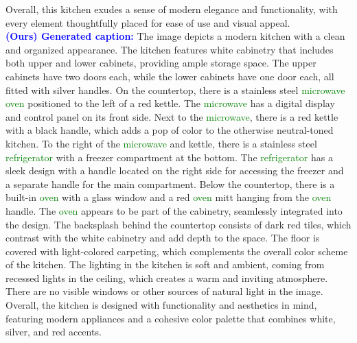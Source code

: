 \begin{tcolorbox}[colback=blue!5!white, colframe=blue!50!black, width=\textwidth, sharp corners, boxrule=0.5mm]
{            Overall, this kitchen exudes a sense of modern elegance and functionality, with every element thoughtfully placed for ease of use and visual appeal.
            \\
            \textcolor{blue}{\textbf{\algname (Ours) Generated caption:}} The image depicts a modern kitchen with a clean and organized appearance. The kitchen features white cabinetry that includes both upper and lower cabinets, providing ample storage space. The upper cabinets have two doors each, while the lower cabinets have one door each, all fitted with silver handles.
            On the countertop, there is a stainless steel \textcolor{green}{microwave} \textcolor{green}{oven} positioned to the left of a red kettle. The \textcolor{green}{microwave} has a digital display and control panel on its front side. Next to the \textcolor{green}{microwave}, there is a red kettle with a black handle, which adds a pop of color to the otherwise neutral-toned kitchen.
            To the right of the \textcolor{green}{microwave} and kettle, there is a stainless steel \textcolor{green}{refrigerator} with a freezer compartment at the bottom. The \textcolor{green}{refrigerator} has a sleek design with a handle located on the right side for accessing the freezer and a separate handle for the main compartment.
            Below the countertop, there is a built-in \textcolor{green}{oven} with a glass window and a red \textcolor{green}{oven} mitt hanging from the \textcolor{green}{oven} handle. The \textcolor{green}{oven} appears to be part of the cabinetry, seamlessly integrated into the design.
            The backsplash behind the countertop consists of dark red tiles, which contrast with the white cabinetry and add depth to the space. The floor is covered with light-colored carpeting, which complements the overall color scheme of the kitchen.
            The lighting in the kitchen is soft and ambient, coming from recessed lights in the ceiling, which creates a warm and inviting atmosphere. There are no visible windows or other sources of natural light in the image.
            Overall, the kitchen is designed with functionality and aesthetics in mind, featuring modern appliances and a cohesive color palette that combines white, silver, and red accents.
            \\  
        }
    
    
\end{tcolorbox}

